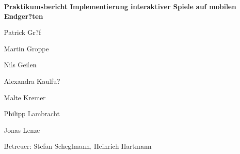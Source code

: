 \begin{titlepage}
\vspace{500mm}
\begin{center}

\textbf{
\Huge{Praktikumsbericht}}
\vspace{10mm}
\textbf{
\huge{Implementierung interaktiver Spiele auf mobilen Endger?ten}}
\vspace{16mm}

\begin{multicols}{2}{
\Large{
Patrick Gr?f

Martin Groppe 

Nils Geilen

Alexandra Kaulfu?

Malte Kremer

Philipp Lambracht 

Jonas Lenze

}
}
\end{multicols}
\end{center}
\vspace{2mm}
\begin{center}
 \Large{Betreuer: Stefan Scheglmann, Heinrich Hartmann}
\end{center}
\end{titlepage}